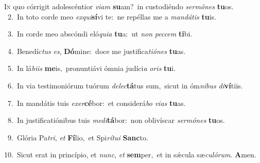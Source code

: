 \lettrine{\initial\textcolor{\initialcolor}{I}}{n} quo córrigit adolescéntior \textit{vi}\-\textit{am} \textbf{su}\-am?~\star in custodiéndo \textit{ser}\-\textit{mó}\textit{nes} \textbf{tu}\-os.\\
{\numbfont\textcolor{\numbcolor}{~2.}}~In toto corde meo \textit{ex}\-\textit{qui}\textbf{sí}vi te:~\star ne repéllas me a \textit{man}\-\textit{dá}\textit{tis} \textbf{tu}\-is.\par
{\numbfont\textcolor{\numbcolor}{~3.}}~In corde meo abscóndi eló\-\textit{qui}\-\textit{a} \textbf{tu}\-a:~\star ut \textit{non} \textit{pec}\-\textit{cem} \textbf{ti}\-bi.\par
{\numbfont\textcolor{\numbcolor}{~4.}}~Benedíc\textit{tus} \textit{es}\-, \textbf{Dó}\-mine:~\star doce me justifica\-\textit{ti}\-\textit{ó}\textit{nes} \textbf{tu}\-as.\par
{\numbfont\textcolor{\numbcolor}{~5.}}~In lá\-\textit{bi}\-\textit{is} \textbf{me}\-is,~\star pronuntiávi ómnia judíci\textit{a} \textit{o}\-\textit{ris} \textbf{tu}\-i.\par
{\numbfont\textcolor{\numbcolor}{~6.}}~In via testimoniórum tuórum \textit{de}\-\textit{lec}\textbf{tá}tus sum,~\star sicut in óm\-\textit{ni}\-\textit{bus} \textit{di}\-\textbf{ví}tiis.\par
{\numbfont\textcolor{\numbcolor}{~7.}}~In mandátis tuis \textit{ex}\-\textit{er}\textbf{cé}bor:~\star et considerá\textit{bo} \textit{vi}\-\textit{as} \textbf{tu}\-as.\par
{\numbfont\textcolor{\numbcolor}{~8.}}~In justificatiónibus tuis \textit{me}\-\textit{di}\textbf{tá}bor:~\star non oblivíscar \textit{ser}\-\textit{mó}\textit{nes} \textbf{tu}\-os.\par
{\numbfont\textcolor{\numbcolor}{~9.}}~Glória Pa\-\textit{tri}\-, \textit{et} \textbf{Fí}\-lio,~\star et Spi\-\textit{rí}\-\textit{tu}\textit{i} \textbf{Sanc}\-to.\par
{\numbfont\textcolor{\numbcolor}{10.}}~Sicut erat in princípio, et \textit{nunc}\-, \textit{et} \textbf{sem}\-per,~\star et in sǽcula sæ\-\textit{cu}\-\textit{ló}\textit{rum}. \textbf{A}\-men.\par
